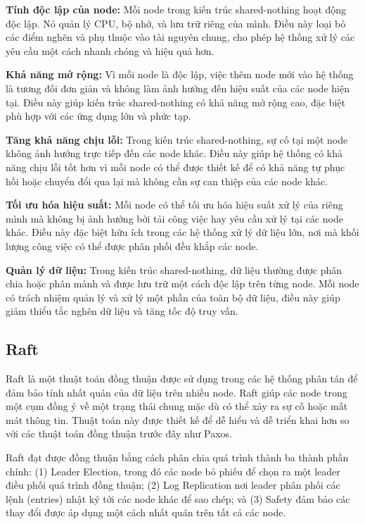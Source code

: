 \documentclass{article}[13pt]
\begin{document}
\textbf{Tính độc lập của node:} Mỗi node trong kiến trúc shared-nothing hoạt động độc lập. Nó quản lý CPU, bộ nhớ, và lưu trữ riêng của mình. Điều này loại bỏ các điểm nghẽn và phụ thuộc vào tài nguyên chung, cho phép hệ thống xử lý các yêu cầu một cách nhanh chóng và hiệu quả hơn.

\textbf{Khả năng mở rộng:} Vì mỗi node là độc lập, việc thêm node mới vào hệ thống là tương đối đơn giản và không làm ảnh hưởng đến hiệu suất của các node hiện tại. Điều này giúp kiến trúc shared-nothing có khả năng mở rộng cao, đặc biệt phù hợp với các ứng dụng lớn và phức tạp.

\textbf{Tăng khả năng chịu lỗi:} Trong kiến trúc shared-nothing, sự cố tại một node không ảnh hưởng trực tiếp đến các node khác. Điều này giúp hệ thống có khả năng chịu lỗi tốt hơn vì mỗi node có thể được thiết kế để có khả năng tự phục hồi hoặc chuyển đổi qua lại mà không cần sự can thiệp của các node khác.

\textbf{Tối ưu hóa hiệu suất:} Mỗi node có thể tối ưu hóa hiệu suất xử lý của riêng mình mà không bị ảnh hưởng bởi tải công việc hay yêu cầu xử lý tại các node khác. Điều này đặc biệt hữu ích trong các hệ thống xử lý dữ liệu lớn, nơi mà khối lượng công việc có thể được phân phối đều khắp các node.

\textbf{Quản lý dữ liệu:} Trong kiến trúc shared-nothing, dữ liệu thường được phân chia hoặc phân mảnh và được lưu trữ một cách độc lập trên từng node. Mỗi node có trách nhiệm quản lý và xử lý một phần của toàn bộ dữ liệu, điều này giúp giảm thiểu tắc nghẽn dữ liệu và tăng tốc độ truy vấn.

\subsection{Raft}

Raft \cite{ongaro2014raft} là một thuật toán đồng thuận được sử dụng trong các hệ thống phân tán để đảm bảo tính nhất quán của dữ liệu trên nhiều node. Raft giúp các node trong một cụm đồng ý về một trạng thái chung mặc dù có thể xảy ra sự cố hoặc mất mát thông tin. Thuật toán này được thiết kế để dễ hiểu và dễ triển khai hơn so với các thuật toán đồng thuận trước đây như Paxos.

Raft đạt được đồng thuận bằng cách phân chia quá trình thành ba thành phần chính: (1) Leader Election, trong đó các node bỏ phiếu để chọn ra một leader điều phối quá trình đồng thuận; (2) Log Replication nơi leader phân phối các lệnh (entries) nhật ký tới các node khác để sao chép; và (3) Safety đảm bảo các thay đổi được áp dụng một cách nhất quán trên tất cả các node.
\end{document}
